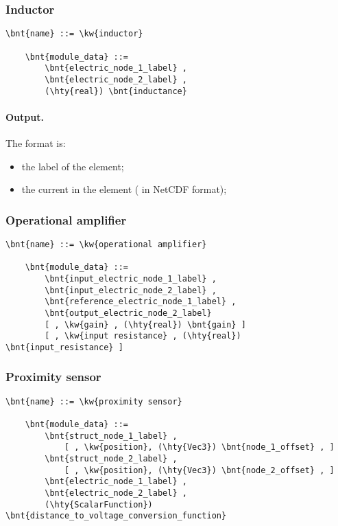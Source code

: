 \subsubsection{Inductor}
\begin{Verbatim}[commandchars=\\\{\}]
    \bnt{name} ::= \kw{inductor}

    \bnt{module_data} ::=
        \bnt{electric_node_1_label} ,
        \bnt{electric_node_2_label} ,
        (\hty{real}) \bnt{inductance}
\end{Verbatim}

\paragraph{Output.}
\label{sec:MODULE:FAB-ELECTRIC:INDUCTOR:OUTPUT}
The format is:
\begin{itemize}
\item the label of the element;
\item the current in the element ( in NetCDF format);
\end{itemize}


\subsubsection{Operational amplifier}
\begin{Verbatim}[commandchars=\\\{\}]
    \bnt{name} ::= \kw{operational amplifier}

    \bnt{module_data} ::=
        \bnt{input_electric_node_1_label} ,
        \bnt{input_electric_node_2_label} ,
        \bnt{reference_electric_node_1_label} ,
        \bnt{output_electric_node_2_label}
        [ , \kw{gain} , (\hty{real}) \bnt{gain} ]
        [ , \kw{input resistance} , (\hty{real}) \bnt{input_resistance} ]
\end{Verbatim}


\subsubsection{Proximity sensor}
\begin{Verbatim}[commandchars=\\\{\}]
    \bnt{name} ::= \kw{proximity sensor}

    \bnt{module_data} ::=
        \bnt{struct_node_1_label} ,
            [ , \kw{position}, (\hty{Vec3}) \bnt{node_1_offset} , ]
        \bnt{struct_node_2_label} ,
            [ , \kw{position}, (\hty{Vec3}) \bnt{node_2_offset} , ]
        \bnt{electric_node_1_label} ,
        \bnt{electric_node_2_label} ,
        (\hty{ScalarFunction}) \bnt{distance_to_voltage_conversion_function}
\end{Verbatim}


